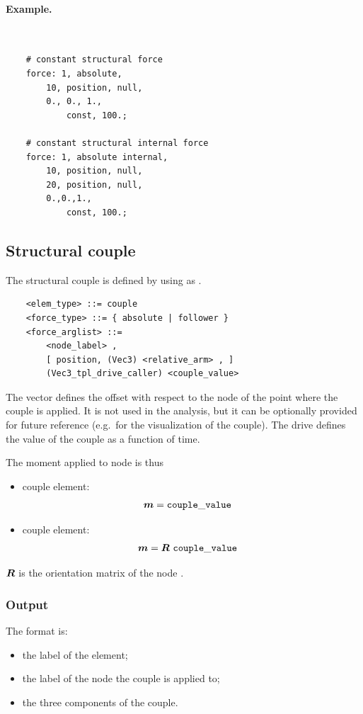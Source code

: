 \paragraph{Example.} \
\begin{verbatim}
    # constant structural force
    force: 1, absolute,
        10, position, null,
        0., 0., 1.,
            const, 100.;

    # constant structural internal force
    force: 1, absolute internal,
        10, position, null,
        20, position, null,
        0.,0.,1.,
            const, 100.;
\end{verbatim}


\subsection{Structural couple}
\label{sec:EL:FORCE:STRUCTURAL:COUPLE}
The structural couple is defined by using  as .
\begin{verbatim}
    <elem_type> ::= couple
    <force_type> ::= { absolute | follower } 
    <force_arglist> ::=
        <node_label> ,
        [ position, (Vec3) <relative_arm> , ]
        (Vec3_tpl_drive_caller) <couple_value>
\end{verbatim}
The vector  defines the offset with respect
to the node of the point where the couple is applied.
It is not used in the analysis, but it can be optionally provided
for future reference (e.g.\ for the visualization of the couple).
The drive \kw{couple\_value} defines the value of the couple
as a function of time.

The moment applied to node  is thus
\begin{itemize}
\item {} couple element:
\begin{align}
	\boldsymbol{m} & = \mathtt{couple\_value}
\end{align}

\item {} couple element:
\begin{align}
	\boldsymbol{m} & = \boldsymbol{R} \ \mathtt{couple\_value}
\end{align}
\end{itemize}
$\boldsymbol{R}$ is the orientation matrix of the node .

\subsubsection{Output}
The format is:
\begin{itemize}
    \item the label of the element;
    \item the label of the node the couple is applied to;
    \item the three components of the couple.
\end{itemize}

